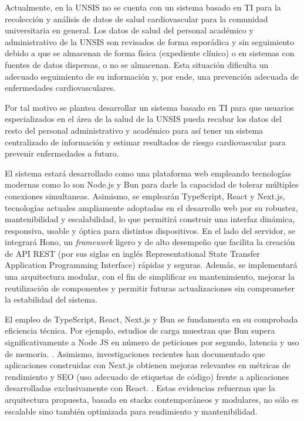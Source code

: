 

    Actualmente, en la UNSIS no se cuenta con un sistema basado en TI para la recolección y análisis de datos de salud cardiovascular para la comunidad universitaria en general. Los datos de salud del personal académico y administrativo de la UNSIS son revisados de forma esporádica y sin seguimiento debido a que se almacenan de forma física (expediente clínico) o en sistemas con fuentes de datos dispersas, o no se almacenan. Esta situación dificulta un adecuado seguimiento de su información y, por ende, una prevención adecuada de enfermedades cardiovasculares. 

    Por tal motivo se plantea desarrollar un sistema basado en TI para que usuarios especializados en el área de la salud de la UNSIS pueda recabar los datos del resto del personal administrativo y académico para así tener un sistema centralizado de información y estimar resultados de riesgo cardiovascular para prevenir enfermedades a futuro.
    
    El sistema estará desarrollado como una plataforma web empleando tecnologías modernas como lo son Node.js y Bun para darle la capacidad de tolerar múltiples conexiones simultaneas. Asimismo, se emplearán TypeScript, React y Next.js, tecnologías actuales ampliamente adoptadas en el desarrollo web por su robustez, mantenibilidad y escalabilidad, lo que permitirá construir una interfaz dinámica, responsiva, usable y óptica para distintos dispositivos. En el lado del servidor, se integrará Hono, un \textit{framework} ligero y de alto desempeño que facilita la creación de API REST (por sus siglas en inglés Representational State Transfer Application Programming Interface) rápidas y seguras. Además, se implementará una arquitectura modular, con el fin de simplificar su mantenimiento, mejorar la reutilización de componentes y permitir futuras actualizaciones sin comprometer la estabilidad del sistema.

    El empleo de TypeScript, React, Next.js y Bun se fundamenta en su comprobada eficiencia técnica. Por ejemplo, estudios de carga muestran que Bun supera significativamente a Node JS en número de peticiones por segundo, latencia y uso de memoria. \textcite{bun2024loadtesting}.
    Asimismo, investigaciones recientes han documentado que aplicaciones construidas con Next.js obtienen mejoras relevantes en métricas de rendimiento y SEO (uso adecuado de etiquetas de código) frente a aplicaciones desarrolladas exclusivamente con React. \textcite{patel2023nextjsperformance}.
    Estas evidencias refuerzan que la arquitectura propuesta, basada en stacks contemporáneos y modulares, no sólo es escalable sino también optimizada para rendimiento y mantenibilidad.


